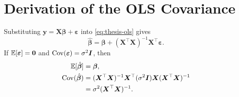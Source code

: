 \chapter{Derivation of the OLS Covariance}\label{app:deriv}

Substituting $\bm y=\bm X\bm\beta+\bm\varepsilon$ into \cref{eq:thesis-ols} gives
\[
  \hat{\bm\beta}
  =\bm\beta+(\bm X^{\top}\bm X)^{-1}\bm X^{\top}\bm\varepsilon.
\]
If $\mathbb{E}[\bm\varepsilon]=\bm 0$ and $\operatorname{Cov}(\bm\varepsilon)=\sigma^2\bm I$, then
\begin{align}
  \mathbb{E}[\hat{\bm\beta}] &= \bm\beta,\\
  \operatorname{Cov}(\hat{\bm\beta})
    &= (\bm X^{\top}\bm X)^{-1}\bm X^{\top}
       (\sigma^2\bm I)\bm X(\bm X^{\top}\bm X)^{-1}\\
    &= \sigma^2(\bm X^{\top}\bm X)^{-1}.
\end{align}
